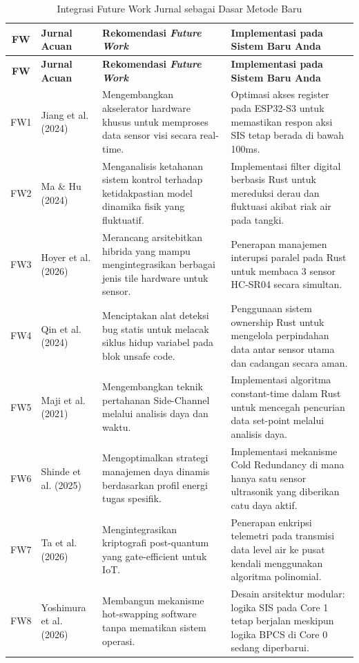 \documentclass[12pt,a4paper]{article}
\begin{document}
\begin{footnotesize}
\begin{longtable}{|c|p{2.8cm}|p{5cm}|p{6.5cm}|}
\caption{Integrasi Future Work Jurnal sebagai Dasar Metode Baru} \\ \hline
\textbf{FW} & \textbf{Jurnal Acuan} & \textbf{Rekomendasi \textit{Future Work}} & \textbf{Implementasi pada Sistem Baru Anda} \\ \hline
\endfirsthead
\hline
\textbf{FW} & \textbf{Jurnal Acuan} & \textbf{Rekomendasi \textit{Future Work}} & \textbf{Implementasi pada Sistem Baru Anda} \\ \hline
\endhead
FW1	& Jiang et al. (2024)	& Mengembangkan akselerator hardware khusus untuk memproses data sensor visi secara real-time.	& Optimasi akses register pada ESP32-S3 untuk memastikan respon aksi SIS tetap berada di bawah 100ms. \\ \hline
FW2	& Ma \& Hu (2024)	& Menganalisis ketahanan sistem kontrol terhadap ketidakpastian model dinamika fisik yang fluktuatif.	& Implementasi filter digital berbasis Rust untuk mereduksi derau dan fluktuasi akibat riak air pada tangki. \\ \hline
FW3	& Hoyer et al. (2026)	& Merancang arsitebitkan hibrida yang mampu mengintegrasikan berbagai jenis tile hardware untuk sensor.	& Penerapan manajemen interupsi paralel pada Rust untuk membaca 3 sensor HC-SR04 secara simultan. \\ \hline
FW4	& Qin et al. (2024)	& Menciptakan alat deteksi bug statis untuk melacak siklus hidup variabel pada blok unsafe code.	& Penggunaan sistem ownership Rust untuk mengelola perpindahan data antar sensor utama dan cadangan secara aman. \\ \hline
FW5	& Maji et al. (2021)	& Mengembangkan teknik pertahanan Side-Channel melalui analisis daya dan waktu.	& Implementasi algoritma constant-time dalam Rust untuk mencegah pencurian data set-point melalui analisis daya. \\ \hline
FW6	& Shinde et al. (2025)	& Mengoptimalkan strategi manajemen daya dinamis berdasarkan profil energi tugas spesifik.	& Implementasi mekanisme Cold Redundancy di mana hanya satu sensor ultrasonik yang diberikan catu daya aktif. \\ \hline
FW7	& Ta et al. (2026)	& Mengintegrasikan kriptografi post-quantum yang gate-efficient untuk IoT.	& Penerapan enkripsi telemetri pada transmisi data level air ke pusat kendali menggunakan algoritma polinomial. \\ \hline
FW8	& Yoshimura et al. (2026)	& Membangun mekanisme hot-swapping software tanpa mematikan sistem operasi.	& Desain arsitektur modular: logika SIS pada Core 1 tetap berjalan meskipun logika BPCS di Core 0 sedang diperbarui. \\ \hline

\end{longtable}
\end{footnotesize}
\end{document}
